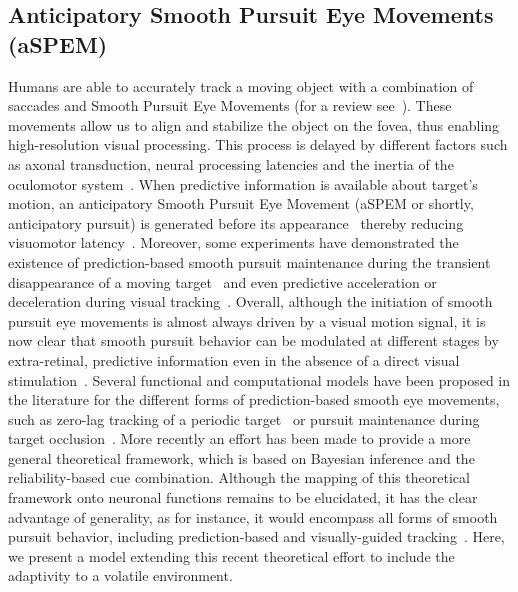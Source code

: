 \documentclass[10pt,letterpaper]{article}
\newcommand{\citep}[1]{\cite{#1}}
\newcommand{\citet}[1]{\cite{#1}}
\begin{document}
\subsection*{Anticipatory Smooth Pursuit Eye Movements (aSPEM)}
Humans are able to accurately track a moving object
with a combination of saccades and
Smooth Pursuit Eye Movements (for a review see~\citet{Krauzlis2008}).
These movements allow us to align and
stabilize the object on the fovea,
thus enabling high-resolution visual processing.
This process is delayed by different factors such as axonal transduction,
neural processing latencies and the inertia of the oculomotor system~\citep{Krauzlis89}.
When predictive information is available about target's motion,
an anticipatory Smooth Pursuit Eye Movement (aSPEM or shortly, anticipatory pursuit)
is generated before its appearance~\citep{Westheimer1954, Kowler1979a, Kowler1979b}
thereby reducing visuomotor latency~\citep{PerrinetAdamasFriston2014}.
Moreover, some experiments have demonstrated the existence
of prediction-based smooth pursuit maintenance during
the transient disappearance of a moving target~\citep{Badler2006,BeckerFuchs1985,OrbandeXivryMissalLefevre_JOV2012}
and even predictive acceleration or deceleration during visual tracking~\citep{BeckerFuchs1985,CollinsBarnes2009}.
Overall, although the initiation of smooth pursuit eye movements
is almost always driven by a visual motion signal,
it is now clear that smooth pursuit behavior
can be modulated at different stages by extra-retinal, predictive information even in the absence of a direct visual stimulation~\citep{Barnes2008}.
Several functional and computational models have been proposed in the literature for the different forms of prediction-based smooth eye movements, such as zero-lag tracking of a periodic target~\citep{DallosJones1963} or pursuit maintenance during target occlusion~\citep{CollinsBarnes2009}. More recently an effort has been made to provide a more general theoretical framework, which is based on Bayesian inference and the reliability-based cue combination. Although the mapping of this theoretical framework onto neuronal functions remains to be elucidated, it has the clear advantage of generality, as for instance, it would encompass all forms of smooth pursuit behavior, including prediction-based and visually-guided tracking~\citep{Bogadhi2013,Orban2013,Deravet_JOV2018,Darlington_NatNeu2018}. Here, we present a model extending this recent theoretical effort to include the adaptivity to a volatile environment.
\end{document}
